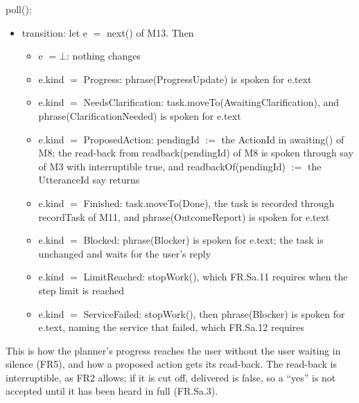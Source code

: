 \documentclass[12pt, titlepage]{article}
\newcommand{\nil}{\bot}
\begin{document}
\noindent poll():
\begin{itemize}
\item transition: let e $=$ next() of M13. Then
\begin{itemize}
\item e $= \nil$: nothing changes
\item e.kind $=$ Progress: phrase(ProgressUpdate) is spoken for e.text
\item e.kind $=$ NeedsClarification: task.moveTo(AwaitingClarification), and
phrase(ClarificationNeeded) is spoken for e.text
\item e.kind $=$ ProposedAction: pendingId $:=$ the ActionId in awaiting() of
M8; the read-back from readback(pendingId) of M8 is spoken through say of M3
with interruptible true, and readbackOf(pendingId) $:=$ the UtteranceId say
returns
\item e.kind $=$ Finished: task.moveTo(Done), the task is recorded through
recordTask of M11, and phrase(OutcomeReport) is spoken for e.text
\item e.kind $=$ Blocked: phrase(Blocker) is spoken for e.text; the task is
unchanged and waits for the user's reply
\item e.kind $=$ LimitReached: stopWork(), which FR.Sa.11 requires when the
step limit is reached
\item e.kind $=$ ServiceFailed: stopWork(), then phrase(Blocker) is spoken for
e.text, naming the service that failed, which FR.Sa.12 requires
\end{itemize}
\end{itemize}

\noindent This is how the planner's progress reaches the user without the user
waiting in silence (FR5), and how a proposed action gets its read-back. The
read-back is interruptible, as FR2 allows; if it is cut off, delivered is false,
so a ``yes'' is not accepted until it has been heard in full (FR.Sa.3).
\end{document}
